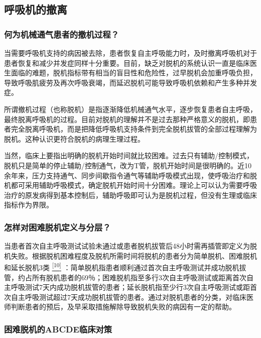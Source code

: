 \subsection{呼吸机的撤离}

\subsubsection{何为机械通气患者的撤机过程？}

当需要呼吸机支持的病因被去除，患者恢复自主呼吸能力时，及时撤离呼吸机对于患者恢复和减少并发症同样十分重要。目前，缺乏对脱机的系统认识一直是临床医生面临的难题，脱机指标带有相当的盲目性和危险性，过早脱机会加重呼吸负担，导致呼吸肌疲劳及再次呼吸衰竭，而延迟脱机可能导致呼吸机依赖和产生多种并发症。

所谓撤机过程（也称脱机）是指逐渐降低机械通气水平，逐步恢复患者自主呼吸，最终脱离呼吸机的过程。目前对脱机的理解并不是过去那种严格意义的脱机，即患者完全脱离呼吸机，而是把降低呼吸机支持条件到完全脱机拔管的全部过程理解为脱机。这种认识更符合脱机的病理生理过程。

当然，临床上要指出明确的脱机开始时间就比较困难。过去只有辅助/控制模式，脱机只是简单的停止辅助/控制通气，改为T管，脱机开始时间是很明确的。近10余年来，压力支持通气、同步间歇指令通气等辅助呼吸模式出现，使呼吸治疗和脱机都可采用辅助呼吸模式，确定脱机开始时间十分困难。理论上可以认为需要呼吸治疗的原发病得到基本控制后，辅助呼吸即可认为是脱机过程，但没有生理或临床指标作为界限。

\subsubsection{怎样对困难脱机定义与分层？}

当患者首次自主呼吸测试试验未通过或患者脱机拔管后48小时需再插管即定义为脱机失败。根据脱机困难程度及脱机所需时间将脱机的患者分为简单脱机、困难脱机和延长脱机3类
\protect\hyperlink{text00016.htmlux5cux23ch10-15}{\textsuperscript{{[}10{]}}}
：简单脱机指患者顺利通过首次自主呼吸测试并成功脱机拔管，约占所有脱机患者的69％；困难脱机指至多行3次自主呼吸测试或距离首次自主呼吸测试7天内成功脱机拔管的患者；延长脱机指至少行3次自主呼吸测试或距首次自主呼吸测试超过7天成功脱机拔管的患者。通过对脱机患者的分类，对临床医师判断患者的预后，及早采取措施解除导致脱机失败的病因有一定的帮助。

\subsubsection{困难脱机的ABCDE临床对策}

